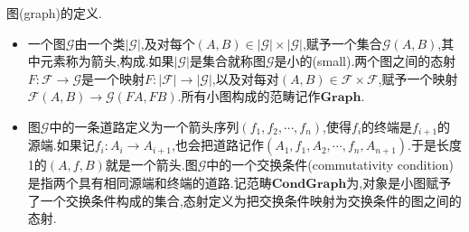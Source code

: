 图(graph)的定义.
\begin{itemize}
	\item 一个图$\mathscr{G}$由一个类$|\mathscr{G}|$,及对每个$(A,B)\in|\mathscr{G}|\times|\mathscr{G}|$,赋予一个集合$\mathscr{G}(A,B)$,其中元素称为箭头,构成.如果$|\mathscr{G}|$是集合就称图$\mathscr{G}$是小的(small).两个图之间的态射$F:\mathscr{F}\to\mathscr{G}$是一个映射$F:|\mathscr{F}|\to|\mathscr{G}|$,以及对每对$(A,B)\in\mathscr{F}\times\mathscr{F}$,赋予一个映射$\mathscr{F}(A,B)\to\mathscr{G}(FA,FB)$.所有小图构成的范畴记作$\textbf{Graph}$.
	\item 图$\mathscr{G}$中的一条道路定义为一个箭头序列$(f_1,f_2,\cdots,f_n)$,使得$f_i$的终端是$f_{i+1}$的源端.如果记$f_i:A_i\to A_{i+1}$,也会把道路记作$(A_1,f_1,A_2,\cdots,f_n,A_{n+1})$.于是长度1的$(A,f,B)$就是一个箭头.图$\mathscr{G}$中的一个交换条件(commutativity condition)是指两个具有相同源端和终端的道路.记范畴$\textbf{CondGraph}$为,对象是小图赋予了一个交换条件构成的集合,态射定义为把交换条件映射为交换条件的图之间的态射.
\end{itemize}

